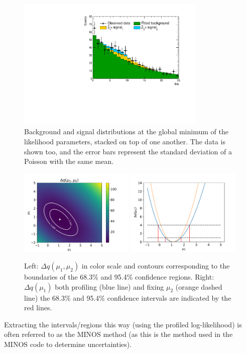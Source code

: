 \begin{figure}
    \centering
     \includegraphics[width=0.8\textwidth]{figures/Intervals/data_model_plot.pdf}
    \caption{Background and signal distributions at the global minimum of the likelihood parameters, stacked on top of one another. The data is shown too, and the error bars represent the standard deviation of a Poisson with the same mean. }
    \label{fig:example_binneddata}
\end{figure}

\begin{figure}[hbt!]
    \centering
    \includegraphics[width=0.49\textwidth]{figures/Intervals/likelihood_scan_mu1_mu2.pdf}
    \includegraphics[width=0.49\textwidth]{figures/Intervals/scan_mu1.pdf}
    \caption{Left: $\Delta q(\mu_1,\mu_2)$ in color scale and contours corresponding to the boundaries of the 68.3\% and 95.4\% confidence regions. Right: $\Delta q(\mu_1)$ both profiling (blue line) and fixing $\mu_{2}$ (orange dashed line) the 68.3\% and 95.4\% confidence intervals are indicated by the red lines.   }
    \label{fig:example_binnedlh}
\end{figure}
Extracting the intervals/regions this way (using the profiled log-likelihood) is often referred to as the \textsf{MINOS} method (as this is the method used in the  \textsf{MINOS} code to determine uncertainties). 
 
